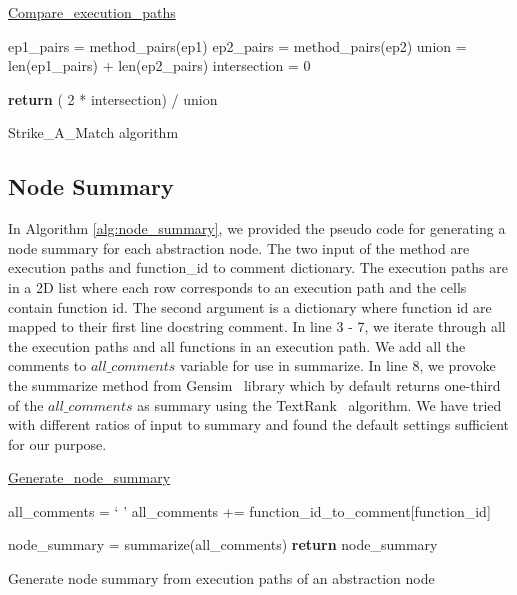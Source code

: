 \begin{algorithm}
    
    \underline{Compare\_execution\_paths} 
    
    ep1\_pairs = method\_pairs(ep1)\; 
    ep2\_pairs = method\_pairs(ep2)\;
    union = len(ep1\_pairs) + len(ep2\_pairs)\;
    intersection = 0\;
    
    \textbf{return} ( 2 * intersection) / union
    
    \caption{Strike\_A\_Match algorithm}
    \label{alg:strike_a_match}
\end{algorithm}

\subsection{Node Summary}

In Algorithm \ref{alg:node_summary}, we provided the pseudo code for generating a node summary for each abstraction node. The two input of the method are execution paths and function\_id to comment dictionary. The execution paths are in a 2D list where each row corresponds to an execution path and the cells contain function id. The second argument is a dictionary where function id are mapped to their first line docstring comment. In line 3 - 7, we iterate through all the execution paths and all functions in an execution path. We add all the comments to $all\_comments$ variable for use in summarize. In line 8, we provoke the summarize method from Gensim~\cite{gensim} library which by default returns one-third of the $all\_comments$ as summary using the TextRank~\cite{mihalcea2004textrank} algorithm. We have tried with different ratios of input to summary and found the default settings sufficient for our purpose.

\begin{algorithm}

    \underline{Generate\_node\_summary} 
    
    all\_comments = ` '\;
    {
        {
            all\_comments += function\_id\_to\_comment[function\_id]\;
        }
    }
    
    node\_summary = summarize(all\_comments)\; 
    \textbf{return} node\_summary
    \caption{Generate node summary from execution paths of an abstraction node}
    \label{alg:node_summary}
\end{algorithm}

